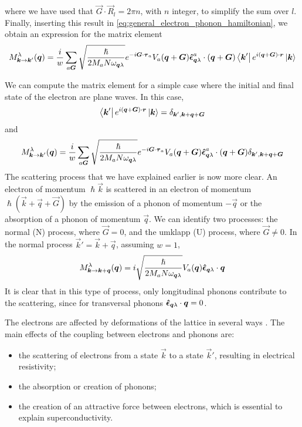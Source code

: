 where we have used that $\vec{G} \cdot \vec{R}_l = 2\pi n$, with $n$ integer, to simplify the sum over $l$. Finally, inserting this result in \cref{eq:general_electron_phonon_hamiltonian}, we obtain an expression for the matrix element
\begin{equation}
    M_{\mathbf{\boldsymbol{k}} \rightarrow \mathbf{\boldsymbol{k}}'}^\lambda(\mathbf{\boldsymbol{q}}) =  \frac{i}{w} \sum_{a\mathbf{\boldsymbol{G}}} \sqrt{\frac{\hslash}{2M_aN\omega_{\mathbf{\boldsymbol{q}}\lambda}}}  e^{-i \mathbf{\boldsymbol{G}} \cdot \mathbf{\boldsymbol{\tau}}_a} V_a(\mathbf{\boldsymbol{q}} + \mathbf{\boldsymbol{G}}) \mathbf{\boldsymbol{\hat{\epsilon}}}_{\mathbf{\boldsymbol{q}}\lambda}^a \cdot (\mathbf{\boldsymbol{q}}+\mathbf{\boldsymbol{G}}) \bra{\mathbf{\boldsymbol{k}}'} e^{i(\mathbf{\boldsymbol{q}} + \mathbf{\boldsymbol{G}})\cdot \mathbf{\boldsymbol{r}}} \ket{\mathbf{\boldsymbol{k}}}
\end{equation}

We can compute the matrix element for a simple case where the initial and final state of the electron are plane waves. In this case,
\begin{equation} \label{eq:plane_waves}
    \bra{\mathbf{\boldsymbol{k}}'} e^{i(\mathbf{\boldsymbol{q}} + \mathbf{\boldsymbol{G}})\cdot \mathbf{\boldsymbol{r}}} \ket{\mathbf{\boldsymbol{k}}} = \delta_{\mathbf{\boldsymbol{k}}', \mathbf{\boldsymbol{k}}+\mathbf{\boldsymbol{q}}+\mathbf{\boldsymbol{G}}}
\end{equation}
and
\begin{equation}
    M_{\mathbf{\boldsymbol{k}} \rightarrow \mathbf{\boldsymbol{k}}'}^\lambda(\mathbf{\boldsymbol{q}}) =  \frac{i}{w} \sum_{a\mathbf{\boldsymbol{G}}} \sqrt{\frac{\hslash}{2M_aN\omega_{\mathbf{\boldsymbol{q}}\lambda}}}  e^{-i \mathbf{\boldsymbol{G}} \cdot \mathbf{\boldsymbol{\tau}}_a} V_a(\mathbf{\boldsymbol{q}} + \mathbf{\boldsymbol{G}}) \mathbf{\boldsymbol{\hat{\epsilon}}}_{\mathbf{\boldsymbol{q}}\lambda}^a \cdot (\mathbf{\boldsymbol{q}}+\mathbf{\boldsymbol{G}}) \delta_{\mathbf{\boldsymbol{k}}', \mathbf{\boldsymbol{k}}+\mathbf{\boldsymbol{q}}+\mathbf{\boldsymbol{G}}}
\end{equation}
The scattering process that we have explained earlier is now more clear. An electron of momentum $\hslash\vec{k}$ is scattered in an electron of momentum $\hslash (\vec{k}+\vec{q}+\vec{G})$ by the emission of a phonon of momentum $-\vec{q}$ or the absorption of a phonon of momentum $\vec{q}$. We can identify two processes: the normal (N) process, where $\vec{G} = 0$, and the umklapp (U) process, where $\vec{G} \neq 0$. In the normal process $\vec{k}' = \vec{k} + \vec{q}$, assuming $w=1$,
\begin{equation} \label{eq:phonon_matrix_normal}
    M_{\mathbf{\boldsymbol{k}} \rightarrow \mathbf{\boldsymbol{k}} + \mathbf{\boldsymbol{q}}}^\lambda(\mathbf{\boldsymbol{q}}) =  i \sqrt{\frac{\hslash}{2M_aN\omega_{\mathbf{\boldsymbol{q}}\lambda}}}   V_a(\mathbf{\boldsymbol{q}}) \mathbf{\boldsymbol{\hat{\epsilon}}}_{\mathbf{\boldsymbol{q}}\lambda} \cdot \mathbf{\boldsymbol{q}}
\end{equation}
It is clear that in this type of process, only longitudinal phonons contribute to the scattering, since for transversal phonons $\mathbf{\boldsymbol{\hat{\epsilon}}}_{\mathbf{\boldsymbol{q}}\lambda} \cdot \mathbf{\boldsymbol{q}} = 0$.

The electrons are affected by deformations of the lattice in several ways \cite{kittel1987}. The main effects of the coupling between  electrons and phonons are:
\begin{itemize}
    \item the scattering of electrons from a state $\vec{k}$ to a state $\vec{k}'$, resulting in electrical resistivity;
    \item the absorption or creation of phonons;
    \item the creation of an attractive force between electrons, which is essential to explain superconductivity.
\end{itemize}

